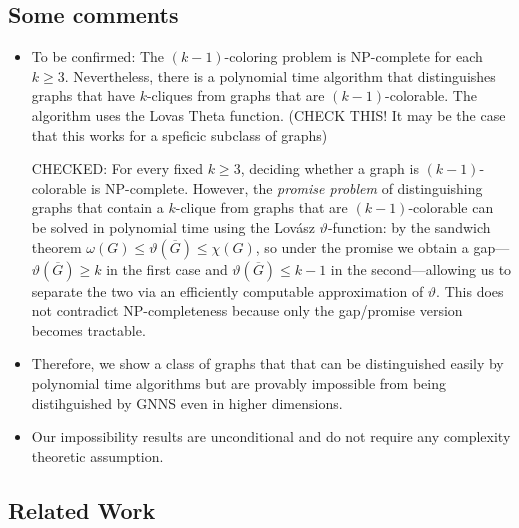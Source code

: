 \subsection{Some comments}

\begin{itemize}
    \item To be confirmed: The $(k-1)$-coloring problem is NP-complete for each $k\geq3$. Nevertheless, there is a polynomial time algorithm that distinguishes graphs 
that have $k$-cliques from graphs that are $(k-1)$-colorable. The algorithm uses the Lovas Theta function. (CHECK THIS! It may be the case that this works for a speficic subclass of graphs)

    CHECKED: For every fixed $k \ge 3$, deciding whether a graph is $(k-1)$-colorable is NP-complete. However, the \emph{promise problem} of distinguishing graphs that contain a $k$-clique from graphs that are $(k-1)$-colorable can be solved in polynomial time using the Lovász $\vartheta$-function: by the sandwich theorem $\omega(G) \le \vartheta(\overline{G}) \le \chi(G)$, so under the promise we obtain a gap---$\vartheta(\overline{G}) \ge k$ in the first case and $\vartheta(\overline{G}) \le k-1$ in the second---allowing us to separate the two via an efficiently computable approximation of $\vartheta$. This does not contradict NP-completeness because only the gap/promise version becomes tractable.

    \item Therefore, we show a class of graphs that that can be distinguished easily by polynomial time algorithms but are provably impossible from being distihguished by GNNS even in higher dimensions.

  \item  Our impossibility results are unconditional and do not require any complexity theoretic assumption. 
     
  
\end{itemize}

\subsection{Related Work}

